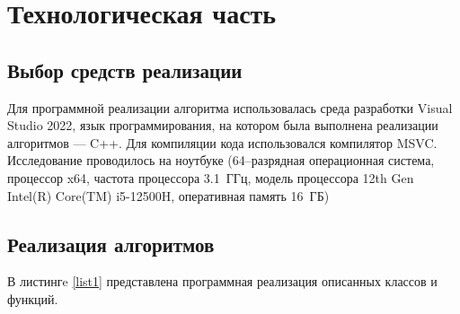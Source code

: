 \chapter{Технологическая часть}

\section{Выбор средств реализации}
Для программной реализации алгоритма использовалась среда разработки Visual Studio 2022, язык программирования, на котором была выполнена реализации алгоритмов --- C++.
Для компиляции кода использовался компилятор MSVC. Исследование проводилось на ноутбуке (64--разрядная операционная система, процессор x64, частота процессора 3.1~ГГц, модель процессора 12th Gen Intel(R) Core(TM) i5-12500H, оперативная память 16~ГБ)
\section{Реализация алгоритмов}
В листингe \ref{list1} представлена программная реализация описанных классов и функций.

